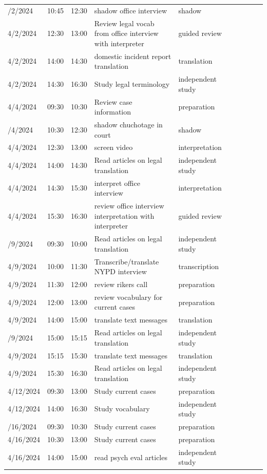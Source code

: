 \documentclass{article}
\begin{document}
\begin{longtable}{lp{1.8cm} l p{5cm} l p{1.5cm} l p{5cm} l p{5cm}}
\addlinespace
4/2/2024 & 10:45 & 12:30 & shadow office interview & shadow\\
4/2/2024 & 12:30 & 13:00 & Review legal vocab from office interview with interpreter & guided review\\
4/2/2024 & 14:00 & 14:30 & domestic incident report translation & translation\\
4/2/2024 & 14:30 & 16:30 & Study legal terminology & independent study\\
4/4/2024 & 09:30 & 10:30 & Review case information & preparation\\
\addlinespace
4/4/2024 & 10:30 & 12:30 & shadow chuchotage in court & shadow\\
4/4/2024 & 12:30 & 13:00 & screen video & interpretation\\
4/4/2024 & 14:00 & 14:30 & Read articles on legal translation & independent study\\
4/4/2024 & 14:30 & 15:30 & interpret office interview & interpretation\\
4/4/2024 & 15:30 & 16:30 & review office interview interpretation with interpreter & guided review\\
\addlinespace
4/9/2024 & 09:30 & 10:00 & Read articles on legal translation & independent study\\
4/9/2024 & 10:00 & 11:30 & Transcribe/translate NYPD interview & transcription\\
4/9/2024 & 11:30 & 12:00 & review rikers call & preparation\\
4/9/2024 & 12:00 & 13:00 & review vocabulary for current cases & preparation\\
4/9/2024 & 14:00 & 15:00 & translate text messages & translation\\
\addlinespace
4/9/2024 & 15:00 & 15:15 & Read articles on legal translation & independent study\\
4/9/2024 & 15:15 & 15:30 & translate text messages & translation\\
4/9/2024 & 15:30 & 16:30 & Read articles on legal translation & independent study\\
4/12/2024 & 09:30 & 13:00 & Study current cases & preparation\\
4/12/2024 & 14:00 & 16:30 & Study vocabulary & independent study\\
\addlinespace
4/16/2024 & 09:30 & 10:30 & Study current cases & preparation\\
4/16/2024 & 10:30 & 13:00 & Study current cases & preparation\\
4/16/2024 & 14:00 & 15:00 & read psych eval articles & independent study\\

\end{longtable}
\end{document}
